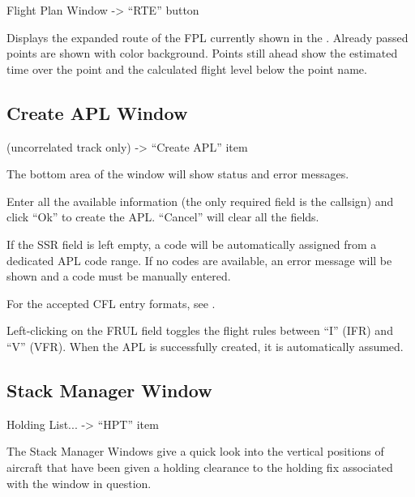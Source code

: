 \documentclass[a4paper,oneside,11pt]{memoir}
\begin{document}
Flight Plan Window -> “RTE” button

\bigskip


Displays the expanded route of the FPL currently shown in the . Already passed points are shown with  color background. Points still ahead show the estimated time over the point and the calculated flight level below the point name.

\subsection{Create APL Window}
\label{win:apl}

 (uncorrelated track only) -> “Create APL” item


\bigskip

The bottom area of the window will show status and error messages.

\bigskip

Enter all the available information (the only required field is the callsign) and click “Ok” to create the APL. “Cancel” will clear all the fields.

\bigskip

If the SSR field is left empty, a code will be automatically assigned from a dedicated APL code range. If no codes are available, an error message will be shown and a code must be manually entered.

\bigskip

For the accepted CFL entry formats, see .

\bigskip

Left-clicking on the FRUL field toggles the flight rules between “I” (IFR) and “V” (VFR).
When the APL is successfully created, it is automatically assumed.

\subsection{Stack Manager Window}
\label{win:smw}
Holding List... -> “HPT” item

\bigskip


The Stack Manager Windows give a quick look into the vertical positions of aircraft that have been given a holding clearance to the holding fix associated with the window in question.
\end{document}
